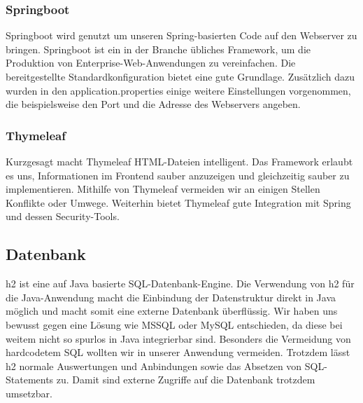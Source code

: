 \subsubsection*{Springboot}
Springboot wird genutzt um unseren Spring-basierten Code auf den Webserver zu bringen. Springboot ist ein in der Branche übliches Framework, um die Produktion von Enterprise-Web-Anwendungen zu vereinfachen. Die bereitgestellte Standardkonfiguration bietet eine gute Grundlage. Zusätzlich dazu wurden in den \glqq{}application.properties\grqq{} einige weitere Einstellungen vorgenommen, die beispielsweise den Port und die Adresse des Webservers angeben.
\subsubsection*{Thymeleaf}
Kurzgesagt macht Thymeleaf HTML-Dateien intelligent. Das Framework erlaubt es uns, Informationen im Frontend sauber anzuzeigen und gleichzeitig sauber zu implementieren. Mithilfe von Thymeleaf vermeiden wir an einigen Stellen Konflikte oder Umwege. Weiterhin bietet Thymeleaf gute Integration mit Spring und dessen Security-Tools.

\subsection{Datenbank}
h2 ist eine auf Java basierte SQL-Datenbank-Engine. Die Verwendung von h2 für die Java-Anwendung macht die Einbindung der Datenstruktur direkt in Java möglich und macht somit eine externe Datenbank überflüssig. Wir haben uns bewusst gegen eine Lösung wie MSSQL oder MySQL entschieden, da diese bei weitem nicht so spurlos in Java integrierbar sind. Besonders die Vermeidung von hardcodetem SQL wollten wir in unserer Anwendung vermeiden. Trotzdem lässt h2 normale Auswertungen und Anbindungen sowie das Absetzen von SQL-Statements zu. Damit sind externe Zugriffe auf die Datenbank trotzdem umsetzbar.
%
%
